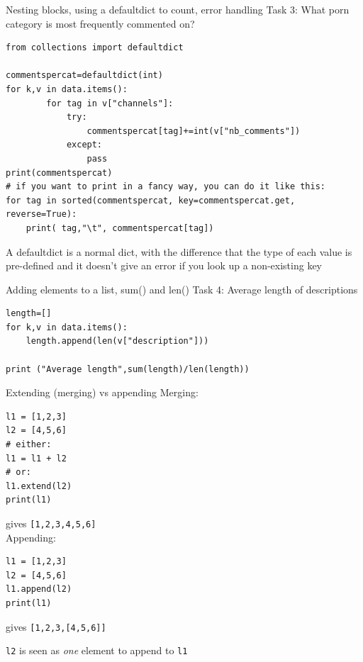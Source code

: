 \documentclass{beamer}
\begin{document}
\begin{frame}[fragile]{Nesting blocks, using a defaultdict to count, error handling}
Task 3: What porn category is most frequently commented on?
\begin{lstlisting}
from collections import defaultdict

commentspercat=defaultdict(int)
for k,v in data.items():
        for tag in v["channels"]:
            try:
                commentspercat[tag]+=int(v["nb_comments"])
            except:
                pass
print(commentspercat)
# if you want to print in a fancy way, you can do it like this:
for tag in sorted(commentspercat, key=commentspercat.get, reverse=True):
    print( tag,"\t", commentspercat[tag])
\end{lstlisting}
\scriptsize{A defaultdict is a normal dict, with the difference that the type of each value is pre-defined and it doesn't give an error if you look up a non-existing key}

\end{frame}



\begin{frame}[fragile]{Adding elements to a list, sum() and len()}
Task 4: Average length of descriptions
\begin{lstlisting}
length=[]
for k,v in data.items():
    length.append(len(v["description"]))
    
print ("Average length",sum(length)/len(length))
\end{lstlisting}

\end{frame}


\begin{frame}[fragile]{Extending (merging) vs appending}
Merging:
\begin{lstlisting}
l1 = [1,2,3]
l2 = [4,5,6]
# either:
l1 = l1 + l2
# or:
l1.extend(l2)
print(l1)
\end{lstlisting}
gives \texttt{[1,2,3,4,5,6]}
~\\

Appending:
\begin{lstlisting}
l1 = [1,2,3]
l2 = [4,5,6]
l1.append(l2)
print(l1)
\end{lstlisting}
gives \texttt{[1,2,3,[4,5,6]]}

\texttt{l2} is seen as \emph{one} element to append to \texttt{l1}
\end{frame}
\end{document}
